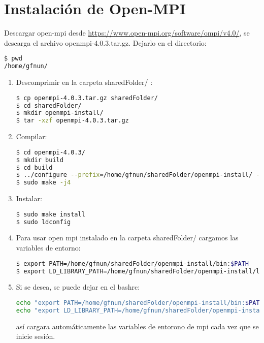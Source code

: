 \section{Instalación de Open-MPI}

Descargar open-mpi desde \url{https://www.open-mpi.org/software/ompi/v4.0/}, se descarga el archivo openmpi-4.0.3.tar.gz. Dejarlo en el directorio:

\begin{lstlisting}[language=bash,style=mystyle]    
$ pwd
/home/gfnun/
\end{lstlisting} 


\begin{enumerate}

    \item Descomprimir en la carpeta sharedFolder/ :
\begin{lstlisting}[language=bash,style=mystyle]    
$ cp openmpi-4.0.3.tar.gz sharedFolder/
$ cd sharedFolder/
$ mkdir openmpi-install/
$ tar -xzf openmpi-4.0.3.tar.gz   
\end{lstlisting}
 
    \item Compilar:
\begin{lstlisting}[language=bash,style=mystyle]  
$ cd openmpi-4.0.3/
$ mkdir build
$ cd build
$ ../configure --prefix=/home/gfnun/sharedFolder/openmpi-install/ --enable-mpi-cxx --enable-orterun-prefix-by-default 
$ sudo make -j4      
\end{lstlisting}
    
    \item Instalar:
\begin{lstlisting}[language=bash,style=mystyle] 
$ sudo make install
$ sudo ldconfig      
\end{lstlisting}
    
    \item Para usar open mpi instalado en la carpeta sharedFolder/ cargamos las variables de entorno:
\begin{lstlisting}[language=bash,style=mystyle]
$ export PATH=/home/gfnun/sharedFolder/openmpi-install/bin:$PATH
$ export LD_LIBRARY_PATH=/home/gfnun/sharedFolder/openmpi-install/lib:$LD_LIBRARY_PATH
\end{lstlisting}   
    
    \item Si se desea, se puede dejar en el bashrc:
\begin{lstlisting}[language=bash,style=mystyle]
echo "export PATH=/home/gfnun/sharedFolder/openmpi-install/bin:$PATH" >> $HOME/.bashrc
echo "export LD_LIBRARY_PATH=/home/gfnun/sharedFolder/openmpi-install/lib:$LD_LIBRARY_PATH" >> $HOME/.bashrc
\end{lstlisting}

así cargara automáticamente las variables de entorono de mpi cada vez que se inicie sesión.
    
\end{enumerate}



